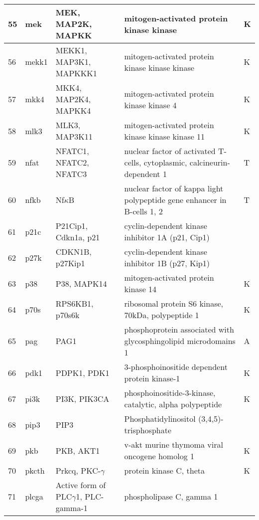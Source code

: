\documentclass[a4paper, 12pt,epsfig, onecolumn]{article}
\begin{document}
{\begin{longtable}{|p{}|p{}|p{}|p{}|p{}|}
\hline
        55 &    mek     & MEK, MAP2K, MAPKK & mitogen-activated protein kinase kinase &          K \\
\hline
        56 &    mekk1   & MEKK1, MAP3K1, MAPKKK1 & mitogen-activated protein kinase kinase kinase &          K \\
\hline
        57 &   mkk4     & MKK4, MAP2K4, MAPKK4 & mitogen-activated protein kinase kinase 4  &          K \\
\hline
        58 &     mlk3   & MLK3, MAP3K11 & mitogen-activated protein kinase kinase kinase 11   &          K \\
\hline
        59 &      nfat  & NFATC1, NFATC2, NFATC3 & nuclear factor of activated T-cells, cytoplasmic, calcineurin-dependent 1    &         T  \\
\hline
        60 &    nfkb    &       Nf$\kappa$B & nuclear factor of kappa light polypeptide gene enhancer in B-cells 1, 2 &         T  \\
\hline
        61 &       p21c & P21Cip1, Cdkn1a, p21 & cyclin-dependent kinase inhibitor 1A (p21, Cip1) &            \\
\hline
        62 &    p27k    & CDKN1B, p27Kip1 & cyclin-dependent kinase inhibitor 1B (p27, Kip1)  &            \\
\hline
        63 &     p38    & P38, MAPK14 & mitogen-activated protein kinase 14 &          K \\
\hline
        64 &    p70s    & RPS6KB1, p70s6k & ribosomal protein S6 kinase, 70kDa, polypeptide 1  &          K \\
\hline
        65 &      pag   &       PAG1 & phosphoprotein associated with glycosphingolipid microdomains 1  &         A  \\
\hline
        66 &     pdk1   & PDPK1, PDK1 & 3-phosphoinositide dependent protein kinase-1    &          K \\
\hline
        67 &      pi3k  & PI3K, PIK3CA & phosphoinositide-3-kinase, catalytic, alpha polypeptide   &          K \\
\hline
        68 &     pip3   &       PIP3 & Phosphatidylinositol (3,4,5)-trisphosphate &            \\
\hline
        69 &      pkb   &  PKB, AKT1 & v-akt murine thymoma viral oncogene homolog 1 &          K \\
\hline
        70 &     pkcth  & Prkcq, PKC-$\gamma$ & protein kinase C, theta  &          K \\
\hline
        71 &    plcga   & Active form of PLC$\gamma$1, PLC-gamma-1 & phospholipase C, gamma 1  &            \\

\end{longtable}}
\end{document}
